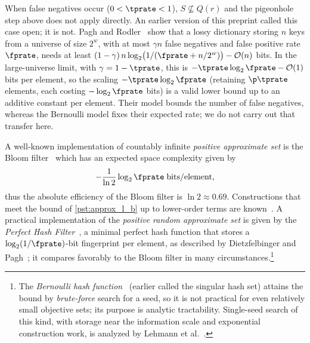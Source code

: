 \begin{remark}
\label{rem:general_lower_bound}
When false negatives occur ($0 < \tprate < 1$), $S \not\subseteq Q(r)$ and the
pigeonhole step above does not apply directly.
An earlier version of this preprint called this case open; it is not.
Pagh and Rodler~\cite[Prop.~1]{paghRodlerLossy} show that a lossy dictionary
storing $n$ keys from a universe of size $2^w$, with at most $\gamma n$ false
negatives and false positive rate $\fprate$, needs at least
$(1-\gamma)\, n \log_2\bigl(1/(\fprate + n/2^w)\bigr) - \mathcal{O}(n)$ bits.
In the large-universe limit, with $\gamma = 1 - \tprate$, this is
$-\tprate \log_2 \fprate - \mathcal{O}(1)$ bits per element, so the scaling
$-\tprate \log_2 \fprate$ (retaining $\p \tprate$ elements, each costing
$-\log_2 \fprate$ bits) is a valid lower bound up to an additive constant per
element.
Their model bounds the number of false negatives, whereas the Bernoulli model
fixes their expected rate; we do not carry out that transfer here.
\end{remark}

A well-known implementation of countably infinite \emph{positive approximate set} is the Bloom filter~\cite{bf} which has an expected space complexity given
by~\cite{broderMitzenmacher}
\begin{equation}
    -\frac{1}{\ln 2} \log_2 \fprate \; \si{bits \per element},
\end{equation}
thus the absolute efficiency of the Bloom filter is $\ln 2 \approx 0.69$.
Constructions that meet the bound of \cref{pst:approx_l_b} up to
lower-order terms are known~\cite{paghPaghRao,dietzfelbingerPagh}.
A practical implementation of the \emph{positive random approximate set} is given by the \emph{Perfect Hash Filter}~\cite{phf}, a minimal perfect hash function that stores a $\log_2(1/\fprate)$-bit fingerprint per element, as described by Dietzfelbinger and Pagh~\cite[Sec.~1]{dietzfelbingerPagh}; it compares favorably to the Bloom filter in many circumstances.\footnote{The \emph{Bernoulli hash function}~\cite{shs} (earlier called the singular hash set) attains the bound by \emph{brute-force} search for a seed, so it is not practical for even relatively small objective sets; its purpose is analytic tractability. Single-seed search of this kind, with storage near the information scale and exponential construction work, is analyzed by Lehmann et al.~\cite{lehmannSeeds}.}

